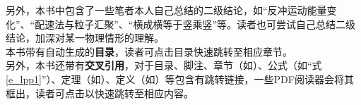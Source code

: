 \documentclass{gbook}
\begin{document}
另外，本书中包含了一些笔者本人自己总结的二级结论，如“反冲运动能量变化”、“配速法与粒子汇聚”、“横成横等于竖乘竖”等。读者也可尝试自己总结二级结论，加深对某一物理情形的理解。
~\\

本书带有自动生成的\textbf{目录}，读者可点击目录快速跳转至相应章节。
~\\

另外，本书还带有\textbf{交叉引用}，对于目录、脚注、章节（如）、公式（如“式\eqref{e_lpp1}”）、定理（如）、定义（如）等包含有跳转链接，一些PDF阅读器会将其框出，读者可点击以快速跳转至相应内容。

\newpage


\setcounter{page}{1}

\tableofcontents

\newpage

\setcounter{page}{1}









\end{document}
